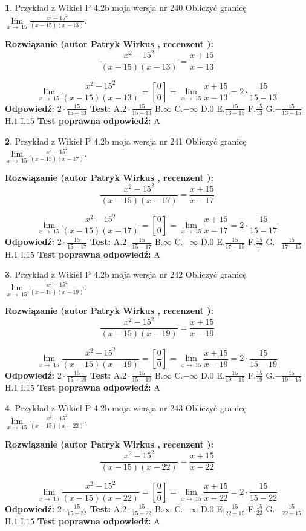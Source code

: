 \documentclass[12pt, a4paper]{article}
\theoremstyle{definition} %
\newtheorem{zad}{}
\newcommand{\zadStart}[1]{\begin{zad}#1\newline}
\newcommand{\zadStop}{\end{zad}}
\newcommand{\rozwStart}[2]{\noindent \textbf{Rozwiązanie (autor #1 , recenzent #2): }\newline}
\newcommand{\rozwStop}{\newline}
\newcommand{\odpStart}{\noindent \textbf{Odpowiedź:}\newline}
\newcommand{\odpStop}{\newline}
\newcommand{\testStart}{\noindent \textbf{Test:}\newline}
\newcommand{\testStop}{\newline}
\newcommand{\kluczStart}{\noindent \textbf{Test poprawna odpowiedź:}\newline}
\newcommand{\kluczStop}{\newline}
\begin{document}
\zadStart{Przykład z Wikieł P 4.2b moja wersja nr 240}
Obliczyć granicę $\lim\limits_{x\to\ 15}\frac{x^{2}-15^{2}}{(x-15)(x-13)}$.
\zadStop
\rozwStart{Patryk Wirkus}{}
$$\frac{x^{2}-15^{2}}{(x-15)(x-13)}=\frac{x+15}{x-13}$$

$$\lim\limits_{x\to\ 15}\frac{x^{2}-15^{2}}{(x-15)(x-13)}=[\frac{0}{0}]=\lim\limits_{x\to\ 15}\frac{x+15}{x-13}=2 \cdot \frac{15}{15-13}$$
\rozwStop
\odpStart
$2 \cdot \frac{15}{15-13}$
\odpStop
\testStart
A.$2 \cdot \frac{15}{15-13}$
B.$\infty$
C.$-\infty$
D.$0$
E.$\frac{15}{13-15}$
F.$\frac{15}{13}$
G.$-\frac{15}{13-15}$
H.$1$
I.$15$
\testStop
\kluczStart
A
\kluczStop



\zadStart{Przykład z Wikieł P 4.2b moja wersja nr 241}
Obliczyć granicę $\lim\limits_{x\to\ 15}\frac{x^{2}-15^{2}}{(x-15)(x-17)}$.
\zadStop
\rozwStart{Patryk Wirkus}{}
$$\frac{x^{2}-15^{2}}{(x-15)(x-17)}=\frac{x+15}{x-17}$$

$$\lim\limits_{x\to\ 15}\frac{x^{2}-15^{2}}{(x-15)(x-17)}=[\frac{0}{0}]=\lim\limits_{x\to\ 15}\frac{x+15}{x-17}=2 \cdot \frac{15}{15-17}$$
\rozwStop
\odpStart
$2 \cdot \frac{15}{15-17}$
\odpStop
\testStart
A.$2 \cdot \frac{15}{15-17}$
B.$\infty$
C.$-\infty$
D.$0$
E.$\frac{15}{17-15}$
F.$\frac{15}{17}$
G.$-\frac{15}{17-15}$
H.$1$
I.$15$
\testStop
\kluczStart
A
\kluczStop



\zadStart{Przykład z Wikieł P 4.2b moja wersja nr 242}
Obliczyć granicę $\lim\limits_{x\to\ 15}\frac{x^{2}-15^{2}}{(x-15)(x-19)}$.
\zadStop
\rozwStart{Patryk Wirkus}{}
$$\frac{x^{2}-15^{2}}{(x-15)(x-19)}=\frac{x+15}{x-19}$$

$$\lim\limits_{x\to\ 15}\frac{x^{2}-15^{2}}{(x-15)(x-19)}=[\frac{0}{0}]=\lim\limits_{x\to\ 15}\frac{x+15}{x-19}=2 \cdot \frac{15}{15-19}$$
\rozwStop
\odpStart
$2 \cdot \frac{15}{15-19}$
\odpStop
\testStart
A.$2 \cdot \frac{15}{15-19}$
B.$\infty$
C.$-\infty$
D.$0$
E.$\frac{15}{19-15}$
F.$\frac{15}{19}$
G.$-\frac{15}{19-15}$
H.$1$
I.$15$
\testStop
\kluczStart
A
\kluczStop



\zadStart{Przykład z Wikieł P 4.2b moja wersja nr 243}
Obliczyć granicę $\lim\limits_{x\to\ 15}\frac{x^{2}-15^{2}}{(x-15)(x-22)}$.
\zadStop
\rozwStart{Patryk Wirkus}{}
$$\frac{x^{2}-15^{2}}{(x-15)(x-22)}=\frac{x+15}{x-22}$$

$$\lim\limits_{x\to\ 15}\frac{x^{2}-15^{2}}{(x-15)(x-22)}=[\frac{0}{0}]=\lim\limits_{x\to\ 15}\frac{x+15}{x-22}=2 \cdot \frac{15}{15-22}$$
\rozwStop
\odpStart
$2 \cdot \frac{15}{15-22}$
\odpStop
\testStart
A.$2 \cdot \frac{15}{15-22}$
B.$\infty$
C.$-\infty$
D.$0$
E.$\frac{15}{22-15}$
F.$\frac{15}{22}$
G.$-\frac{15}{22-15}$
H.$1$
I.$15$
\testStop
\kluczStart
A
\kluczStop
\end{document}
